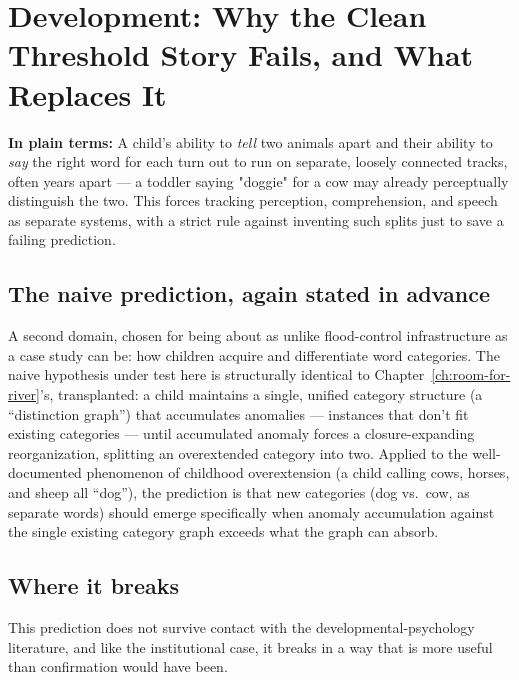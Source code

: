 \chapter{Development: Why the Clean Threshold Story Fails, and What Replaces It}
\label{ch:development}

\begin{plainlanguage}
\textbf{In plain terms:} A child's ability to \emph{tell} two animals apart and their ability to \emph{say} the right word for each turn out to run on separate, loosely connected tracks, often years apart — a toddler saying "doggie" for a cow may already perceptually distinguish the two. This forces tracking perception, comprehension, and speech as separate systems, with a strict rule against inventing such splits just to save a failing prediction.
\end{plainlanguage}

\section{The naive prediction, again stated in advance}

\begin{naivemodel}
A second domain, chosen for being about as unlike flood-control infrastructure as a case study can be: how children acquire and differentiate word categories. The naive hypothesis under test here is structurally identical to Chapter~\ref{ch:room-for-river}'s, transplanted: a child maintains a single, unified category structure (a ``distinction graph'') that accumulates anomalies --- instances that don't fit existing categories --- until accumulated anomaly forces a closure-expanding reorganization, splitting an overextended category into two. Applied to the well-documented phenomenon of childhood overextension (a child calling cows, horses, and sheep all ``dog''), the prediction is that new categories (dog vs.\ cow, as separate words) should emerge specifically when anomaly accumulation against the single existing category graph exceeds what the graph can absorb.
\end{naivemodel}

\section{Where it breaks}

This prediction does not survive contact with the developmental-psychology literature, and like the institutional case, it breaks in a way that is more useful than confirmation would have been.

